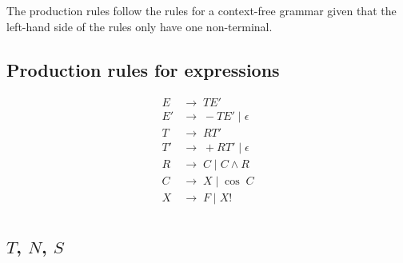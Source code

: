 \documentclass[a4paper, 12pt, oneside]{book}
\begin{document}
The production rules follow the rules for a context-free grammar given that the left-hand side of the rules only have one non-terminal.

\subsection{Production rules for expressions}

\begin{align*}
  E  & \rightarrow \; TE'                   \\
  E' & \rightarrow \; -TE' \; | \; \epsilon \\
  T  & \rightarrow \; RT'                   \\
  T' & \rightarrow \; +RT' \; | \; \epsilon \\
  R  & \rightarrow \; C \; | \; C \wedge R  \\
  C  & \rightarrow \; X \; | \; \cos \; C   \\
  X  & \rightarrow \; F \; | \; X!          \\
\end{align*}

\subsection{$T$, $N$, $S$}
\end{document}
